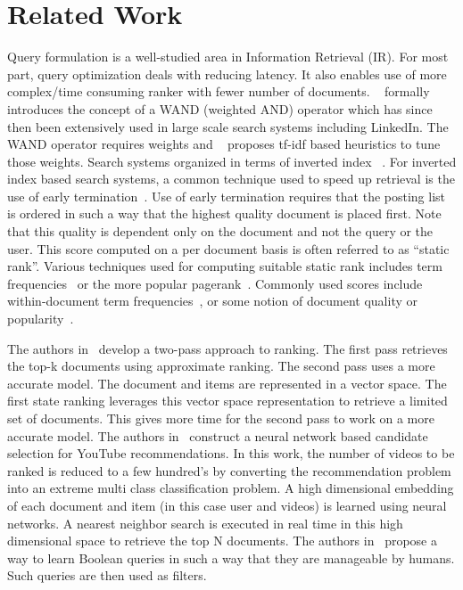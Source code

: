 \section{Related Work}
Query formulation is a well-studied area in Information Retrieval (IR). For
most part, query optimization deals with reducing latency. It also enables use
of more complex/time consuming ranker with fewer number of documents. 
~\cite{broder2003efficient} formally introduces the concept of a WAND (weighted AND) operator which has since
then been extensively used in large scale search systems including LinkedIn.
The WAND operator requires weights and ~\cite{broder2003efficient} proposes
tf-idf based heuristics to tune those weights. Search systems organized in
terms of inverted index ~\cite{goel2009predictive}. For inverted index based
search systems, a common technique used to speed up retrieval is the use of
early termination~\cite{anh2001vector,yan2010efficient,zhang2010revisiting}.
Use of early termination requires that the posting list 
is ordered in such a way that the highest quality document is
placed first. Note that this quality is dependent only on the document and not
the query or the user. This score computed on a per document basis is often
referred to as ``static rank''. 
Various techniques used for computing suitable
static rank includes term frequencies~\cite{persin1996filtered} or the more
popular pagerank~\cite{brin2007anatomy}.
Commonly used scores include within-document term frequencies~\cite{persin1996filtered},
or some notion of document quality or popularity~\cite{brin2007anatomy}.

The authors in~\cite{agarwal2012fast} develop a two-pass approach to ranking. The first pass
retrieves the top-k documents using approximate ranking. The second pass uses a
more accurate model. The document and items are represented in a vector space.
The first state ranking leverages this vector space representation to retrieve
a limited set of documents. This gives more time for the second pass to work on
a more accurate model. 
The authors in~\cite{covington2016deep} construct a neural network based candidate
selection for YouTube recommendations. In this work, the
number of videos to be ranked is reduced to a few hundred's by converting the
recommendation problem into an extreme multi class classification problem. A
high dimensional embedding of each document and item (in this case user and videos) 
is learned using neural networks. A nearest neighbor search is executed in real
time in this high dimensional space to retrieve the top N documents.
The authors in~\cite{aphi2004learning} propose a way to learn Boolean queries in
such a way that they are manageable by humans. Such queries are then used as
filters. 

